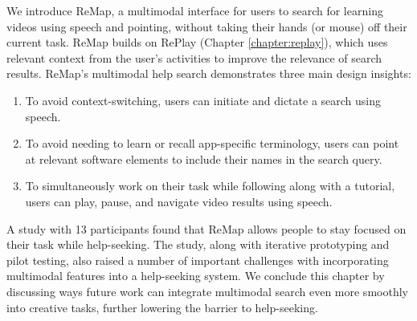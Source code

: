 We introduce ReMap, a multimodal interface for users to search for learning videos using speech and pointing, without taking their hands (or mouse) off their current task. ReMap builds on RePlay (Chapter \ref{chapter:replay}), which uses relevant context from the user's activities to improve the relevance of search results. ReMap's multimodal help search demonstrates three main design insights:
\begin{enumerate}
\item To avoid context-switching, users can initiate and dictate a search using speech.
\item To avoid needing to learn or recall app-specific terminology, users can point at relevant software elements to include their names in the search query.
\item To simultaneously work on their task while following along with a tutorial, users can play, pause, and navigate video results using speech.
\end{enumerate}

A study with 13 participants found that ReMap allows people to stay focused on their task while help-seeking. The study, along with iterative prototyping and pilot testing, also raised a number of important challenges with incorporating multimodal features into a help-seeking system. We conclude this chapter by discussing ways future work can integrate multimodal search even more smoothly into creative tasks, further lowering the barrier to help-seeking.